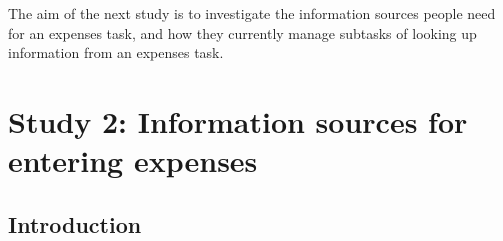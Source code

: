The aim of the next study is to investigate the information sources people need for an expenses task, and how they currently manage subtasks of looking up information from an expenses task. 

\section{Study 2: Information sources for entering expenses}

\subsection{Introduction}

